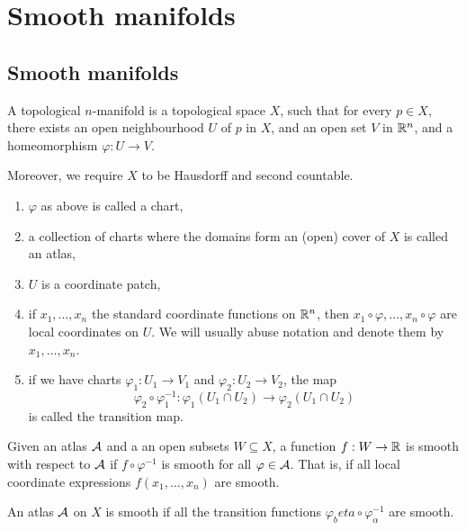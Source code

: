 \section{Smooth manifolds}

\subsection{Smooth manifolds}

\begin{definition}
     A topological \(n\)-manifold is a topological space \(X\), such that for every \(p \in X\), there exists an open neighbourhood \(U\) of \(p\) in \(X\), and an open set \(V\) in \(\mathbb{R}^n\), and a homeomorphism \(\varphi : U \to V\).
    
    Moreover, we require \(X\) to be Hausdorff and second countable.

    \begin{enumerate}
        \item \(\varphi\) as above is called a chart,
        \item a collection of charts where the domains form an (open) cover of \(X\) is called an atlas,
        \item \(U\) is a coordinate patch,
        \item if \(x_1, \dots, x_n\) the standard coordinate functions on \(\mathbb{R}^n\), then \(x_1 \circ \varphi, \dots, x_n \circ \varphi\) are local coordinates on \(U\). We will usually abuse notation and denote them by \(x_1, \dots, x_n\).
        \item if we have charts \(\varphi_1 : U_1 \to V_1\) and \(\varphi_2 : U_2 \to V_2\), the map
        \[\varphi_2 \circ \varphi_1^{-1} : \varphi_1(U_1 \cap U_2) \to \varphi_2(U_1 \cap U_2)\]
        is called the transition map.
    \end{enumerate}
\end{definition}

\begin{definition}

    Given an atlas \(\mathcal{A}\) and a an open subsets \(W \subseteq X\), a function \(f : W \to \mathbb{R}\) is smooth with respect to \(\mathcal{A}\) if \(f \circ \varphi^{-1}\) is smooth for all \(\varphi \in \mathcal{A}\). That is, if all local coordinate expressions \(f(x_1, \dots, x_n)\) are smooth.
\end{definition}

\begin{definition}

    An atlas \(\mathcal{A}\) on \(X\) is smooth if all the transition functions \(\varphi_beta \circ \varphi_\alpha^{-1}\) are smooth.
\end{definition}

